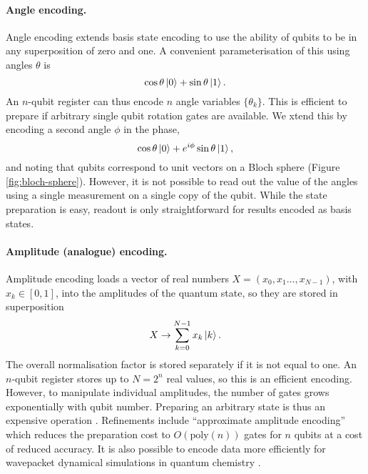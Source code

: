 \documentclass[10pt]{iopart}
\begin{document}
\paragraph{Angle encoding.} Angle encoding extends basis state encoding to use the ability of qubits to be in any superposition of zero and one.  A convenient parameterisation of this using angles $\theta$ is
\[
\cos\theta\ket{0} + \sin{\theta}\ket{1}.
\]
An $n$-qubit register can thus encode $n$ angle variables $\{\theta_k\}$.  This is efficient to prepare if arbitrary single qubit rotation gates are available. We xtend this by encoding a second angle $\phi$ in the phase,
\[
\cos\theta\ket{0} + e^{i\phi}\sin{\theta}\ket{1},
\]
and noting that qubits correspond to unit vectors on a Bloch sphere (Figure \ref{fig:bloch-sphere}).  However, it is not possible to read out the value of the angles using a single measurement on a single copy of the qubit.  While the state preparation is easy, readout is only straightforward for results encoded as basis states.

\paragraph{Amplitude (analogue) encoding.} Amplitude encoding loads a vector of real numbers $X=(x_0,x_1\dots,x_{N-1})$, with $x_k\in[0,1]$, into the amplitudes of the quantum state, so they are stored in superposition 
\[
X \to \sum_{k=0}^{N-1} x_k \ket{k}.
\]
The overall normalisation factor is stored separately if it is not equal to one.  An $n$-qubit register stores up to $N=2^n$ real values, so this is an efficient encoding. However, to manipulate individual amplitudes, the number of gates grows exponentially with qubit number. Preparing an arbitrary state is thus an expensive operation \cite{Long2001,Grover2002,Plesch2011,Sanders2019}. Refinements include ``approximate amplitude encoding'' \cite{Nakaji2022,Mitsuda2022} which reduces the preparation cost to $O(\text{poly}(n))$ gates for $n$ qubits at a cost of reduced accuracy. It is also possible to encode data more efficiently for wavepacket dynamical simulations in quantum chemistry \cite{Ollitrault2020,Chan2023}.
\end{document}
